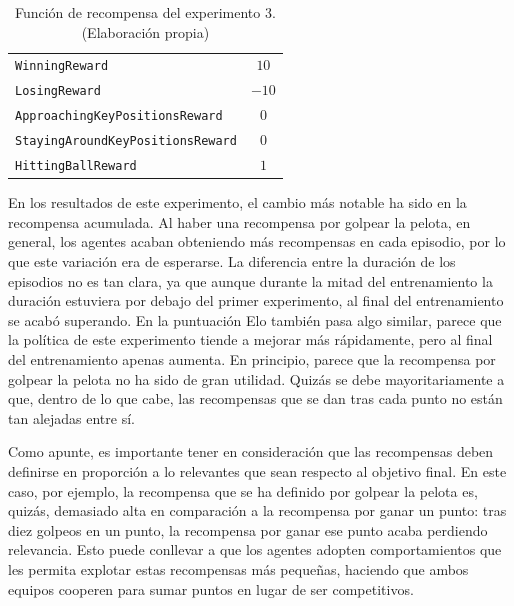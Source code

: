 \begin{table}[H]
\centering
    \begin{tabular}{|>{\rowmac}p{6.5cm}|>{\rowmac}c<{\clearrow}|} 
        \hline
        \multicolumn{1}{|c|}{\textbf{Recompensa}} & \multicolumn{1}{c|}{\textbf{Valor}} \\ \hline \hline
        \texttt{WinningReward} & $10$ \\
        \hline
        \texttt{LosingReward} & $-10$ \\
        \hline
        \texttt{ApproachingKeyPositionsReward} & $0$ \\
        \hline
        \texttt{StayingAroundKeyPositionsReward} & $0$ \\
        \hline
        \texttt{HittingBallReward} & $1$ \\
        \hline
    \end{tabular}
    \caption[Función de recompensa del experimento 3]{Función de recompensa del experimento 3. (Elaboración propia)}
    \label{tab:exp3-rewards}
\end{table}

En los resultados de este experimento, el cambio más notable ha sido en la recompensa acumulada. Al haber una recompensa por golpear la pelota, en general, los agentes acaban obteniendo más recompensas en cada episodio, por lo que este variación era de esperarse. La diferencia entre la duración de los episodios no es tan clara, ya que aunque durante la mitad del entrenamiento la duración estuviera por debajo del primer experimento, al final del entrenamiento se acabó superando. En la puntuación Elo también pasa algo similar, parece que la política de este experimento tiende a mejorar más rápidamente, pero al final del entrenamiento apenas aumenta. En principio, parece que la recompensa por golpear la pelota no ha sido de gran utilidad. Quizás se debe mayoritariamente a que, dentro de lo que cabe, las recompensas que se dan tras cada punto no están tan alejadas entre sí.

Como apunte, es importante tener en consideración que las recompensas deben definirse en proporción a lo relevantes que sean respecto al objetivo final. En este caso, por ejemplo, la recompensa que se ha definido por golpear la pelota es, quizás, demasiado alta en comparación a la recompensa por ganar un punto: tras diez golpeos en un punto, la recompensa por ganar ese punto acaba perdiendo relevancia. Esto puede conllevar a que los agentes adopten comportamientos que les permita explotar estas recompensas más pequeñas, haciendo que ambos equipos cooperen para sumar puntos en lugar de ser competitivos.

